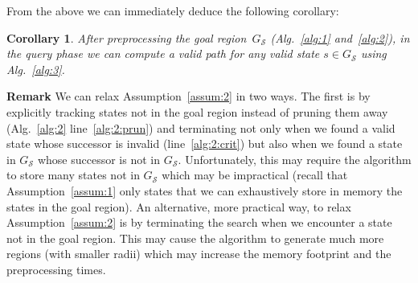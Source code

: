 \documentclass[letterpaper]{article} %
\newcommand{\calS}{\ensuremath{\mathcal{S}}\xspace}
\newtheorem{cor}{Corollary}
\begin{document}
From the above we can immediately deduce the following corollary:

\vspace{2mm}

\begin{cor}
	After preprocessing the goal region~$G_\calS$ (Alg.~\ref{alg:1} and~\ref{alg:2}), in the query phase we can compute a valid path for any valid state $s \in G_\calS$ using Alg.~\ref{alg:3}.
\end{cor}


\textbf{Remark}
We can relax Assumption~\ref{assum:2} in two ways.
The first is by explicitly tracking states not in the goal region instead of pruning them away (Alg.~\ref{alg:2} line~\ref{alg:2:prun}) and terminating not only when we found a valid state whose successor is invalid (line~\ref{alg:2:crit}) but also when we found a state in $G_\calS$ whose successor is not in $G_\calS$.
Unfortunately, this may require the algorithm to store many states not in $G_\calS$  which may be impractical (recall that Assumption~\ref{assum:1} only states that we can exhaustively store in memory the states in the goal region).
An alternative, more practical way, to relax Assumption~\ref{assum:2}  is by terminating the search when we  encounter a state not in the goal region.
This may cause the algorithm to generate much more regions (with smaller radii) which may increase the memory footprint and the preprocessing times.
\end{document}
